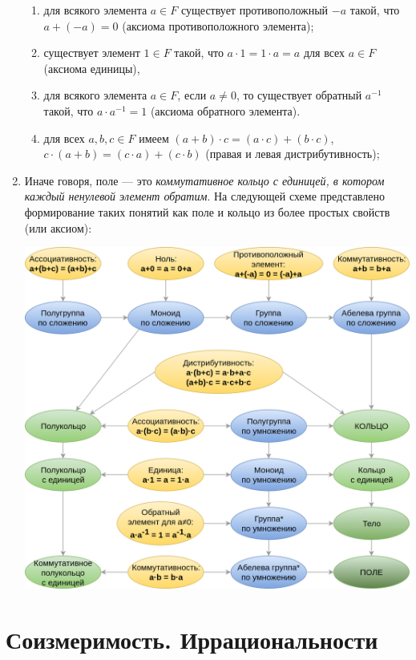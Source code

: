 \begin{enumerate}
\begin{enumerate}[{\bf Field}1]
\item для всякого элемента $a\in F$ существует противоположный $-a$ такой, что $a+(-a)=0$ (аксиома противоположного элемента);
\item существует элемент $1\in F$ такой, что $a\cdot 1=1\cdot a=a$ для всех $a\in F$ (аксиома единицы),
\item для всякого элемента $a\in F$, если $a\ne 0$, то существует обратный $a^{-1}$ такой, что $a\cdot a^{-1}=1$ (аксиома обратного элемента).
\item для всех $a,b,c\in F$ имеем $(a+b)\cdot c=(a\cdot c)+(b\cdot c)$, $c\cdot(a+b)=(c\cdot a)+(c\cdot b)$ (правая и левая дистрибутивность);
\end{enumerate}
\item Иначе говоря, поле --- это \textit{коммутативное кольцо с единицей, в котором каждый ненулевой элемент обратим}. На следующей схеме представлено формирование таких понятий как поле и кольцо из более простых свойств (или аксиом):
\begin{center}
\includegraphics[scale=0.25]{Ring.png}
\end{center}
\end{enumerate}




\section{Соизмеримость. Иррациональности}

